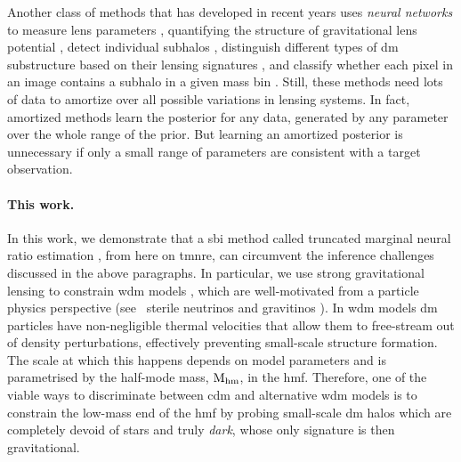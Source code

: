 Another class of methods that has developed in recent years uses \emph{neural networks} to measure lens parameters \cite{Hezaveh:2017sht, PerreaultLevasseur:2017ltk,  Morningstar:2019szx}, quantifying the structure of gravitational lens potential \cite{Vernardos:2020aa}, detect individual subhalos \cite{Rivero:2020aa}, distinguish different types of \gls*{dm} substructure based on their lensing signatures \cite{Alexander:2019puy}, and classify whether each pixel in an image contains a subhalo in a given mass bin \cite{Ostdiek:2020cqz,Ostdiek:2020mvo}. Still, these methods need lots of data to amortize over all possible variations in lensing systems. In fact, amortized methods learn the posterior for any data, generated by any parameter over the whole range of the prior. But learning an amortized posterior is unnecessary if only a small range of parameters are consistent with a target observation.
 

\paragraph*{This work.} In this work, we demonstrate that a \gls*{sbi} \cite{Cranmer:2019eaq} method called truncated marginal neural ratio estimation \cite{Miller:2020hua,Miller:2021aa}, from here on \gls*{tmnre}, can circumvent the inference challenges discussed in the above paragraphs. 
In particular, we use strong gravitational lensing to constrain \gls*{wdm} models \cite{Colin:2000dn, Lovell:2013ola}, which are well-motivated from a particle physics perspective (see \eg~sterile neutrinos \cite{Boyarsky:2018tvu} and gravitinos \cite{Bond:1982uy}). In \gls*{wdm} models \gls*{dm} particles have non-negligible thermal velocities that allow them to free-stream out of density perturbations, effectively preventing small-scale structure formation. The scale at which this happens depends on model parameters and is parametrised by the half-mode mass, $\mathrm{M_{hm}}$, in the \gls*{hmf}. Therefore, one of the viable ways to discriminate between \gls*{cdm} and alternative \gls*{wdm} models is to constrain the low-mass end of the \gls*{hmf} by probing small-scale \gls*{dm} halos which are completely devoid of stars and truly \emph{dark}, whose only signature is then gravitational. 

